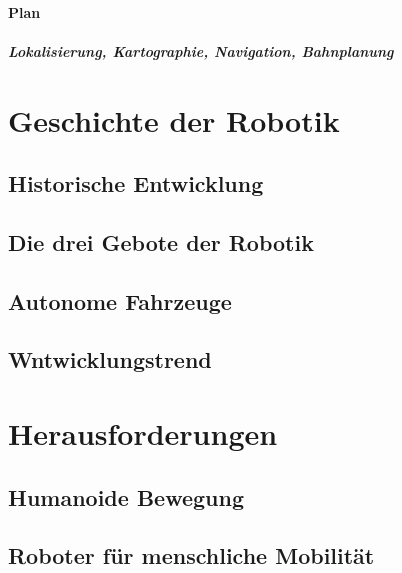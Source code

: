 \documentclass[a4paper, 11pt, accentcolor = tud3b]{tudreport}
\begin{document}
			\paragraph{Plan} %

				\subparagraph{Lokalisierung, Kartographie, Navigation, Bahnplanung} %

		\section{Geschichte der Robotik} %

			\subsection{Historische Entwicklung} %

			\subsection{Die drei Gebote der Robotik} %

			\subsection{Autonome Fahrzeuge} %

			\subsection{Wntwicklungstrend} %

		\section{Herausforderungen} %

			\subsection{Humanoide Bewegung} %

			\subsection{Roboter für menschliche Mobilität} %
\end{document}
